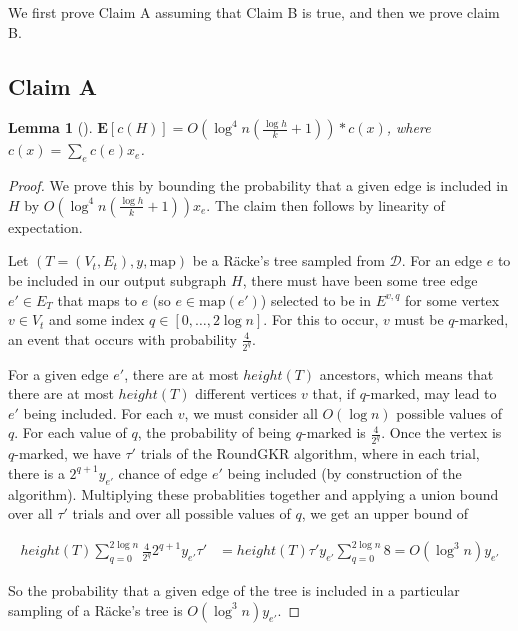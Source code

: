 \documentclass[12pt]{article}
\newtheorem{lemma}{Lemma}
\begin{document}
We first prove Claim A assuming that Claim B is true, and then we prove claim B.


\subsection{Claim A}

\begin{lemma}[\cite{ssc}]
\label{lem:cost}
$\textbf{E}[c(H)] = O(\log^4n(\frac{\log h}{k}+1)) * c(x)$, where $c(x) = \sum_e c(e)x_e$. 
\end{lemma}

\begin{proof}
We prove this by bounding the probability that a given edge is included in $H$ by $O(\log^4n(\frac{\log h}{k} + 1))x_e$. The claim then follows by linearity of expectation.

Let $(T = (V_t, E_t), y, \text{map})$ be a R\"{a}cke's tree sampled from $\mathcal{D}$. For an edge $e$ to be included in our output subgraph $H$, there must have been some tree edge $e' \in E_T$ that maps to $e$ (so $e \in \mathrm{map}(e')$) selected to be in $E^{v,q}$ for some vertex $v \in V_t$ and some index $q \in [0,\dots,2\log n]$. For this to occur, $v$ must be $q$-marked, an event that occurs with probability $\frac{4}{2^{q}}$. 

For a given edge $e'$, there are at most $height(T)$ ancestors, which means that there are at most $height(T)$ different vertices $v$ that, if $q$-marked, may lead to $e'$ being included. For each $v$, we must consider all $O(\log n)$ possible values of $q$. For each value of $q$, the probability of being $q$-marked is $\frac{4}{2^{q}}$. Once the vertex is $q$-marked, we have $\tau'$ trials of the RoundGKR algorithm, where in each trial, there is a $2^{q+1}y_{e'}$ chance of edge $e'$ being included (by construction of the algorithm). Multiplying these probablities together and applying a union bound over all $\tau'$ trials and over all possible values of $q$, we get an upper bound of 

\begin{align}
height(T) \sum_{q=0}^{2\log n} \frac{4}{2^{q}} 2^{q+1} y_{e'} \tau' &= height(T) \tau' y_{e'} \sum_{q=0}^{2\log n} 8 = O(\log^3 n) y_{e'} 
\end{align}

So the probability that a given edge of the tree is included in a particular sampling of a R\"{a}cke's tree is $O(\log^3 n) y_{e'}$. 


\end{proof}
\end{document}
